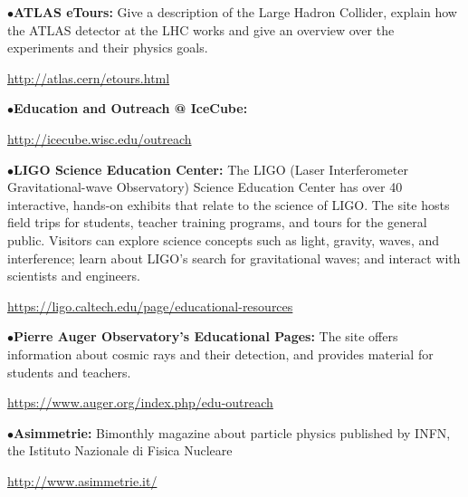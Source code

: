 \item{$\bullet$}{\bf ATLAS eTours:} 
Give a description of the Large Hadron Collider, explain how the ATLAS detector at the LHC works and give an overview over the experiments and their physics goals. 
	\item{}\qquad\url{http://atlas.cern/etours.html}

\smallskip


\smallskip

\item{$\bullet$}{\bf Education and Outreach @ IceCube:}
    \item{}\qquad\url{http://icecube.wisc.edu/outreach}


\smallskip

\item{$\bullet$}{\bf LIGO Science Education Center:}
The LIGO (Laser Interferometer 
Gravitational-wave Observatory) Science Education Center has over 
40 interactive, hands-on exhibits that relate to the science of LIGO. The 
site hosts field trips for students, teacher training programs, and tours 
for the general public. Visitors can explore science concepts such as 
light, gravity, waves, and interference; learn about LIGO's search for 
gravitational waves; and interact with scientists and engineers.
     \item{}\qquad\url{https://ligo.caltech.edu/page/educational-resources}


\smallskip

\item{$\bullet$}{\bf Pierre Auger Observatory's Educational Pages:}
The site offers information about cosmic rays and their detection, and provides material for students and teachers.
     \item{}\qquad\url{https://www.auger.org/index.php/edu-outreach}

\medskip
\medskip



\medskip


\item{$\bullet$}{\bf Asimmetrie:}
Bimonthly magazine about particle physics published by INFN, the Istituto Nazionale di Fisica Nucleare
	\item{}\qquad\url{http://www.asimmetrie.it/}
\medskip

